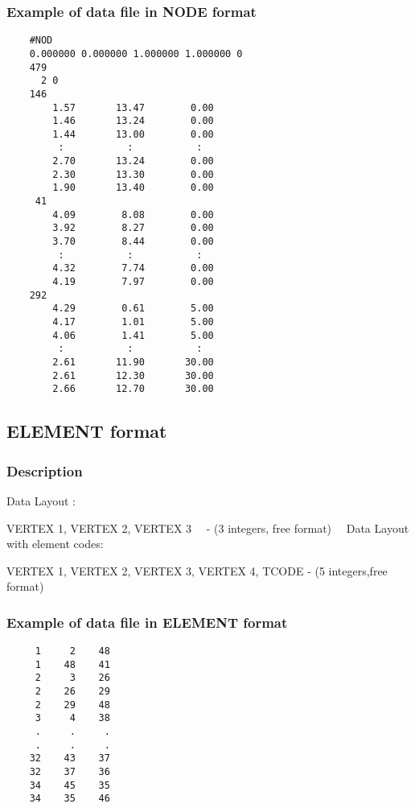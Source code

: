 \documentclass{article}
\begin{document}
\subsubsection{Example of data file in NODE format}

\begin{small}
\begin{lstlisting}
    #NOD 
    0.000000 0.000000 1.000000 1.000000 0 
    479
      2 0
    146
        1.57       13.47        0.00
        1.46       13.24        0.00
        1.44       13.00        0.00
         :           :           :
        2.70       13.24        0.00
        2.30       13.30        0.00
        1.90       13.40        0.00
     41
        4.09        8.08        0.00
        3.92        8.27        0.00
        3.70        8.44        0.00
         :           :           :
        4.32        7.74        0.00
        4.19        7.97        0.00
    292
        4.29        0.61        5.00
        4.17        1.01        5.00
        4.06        1.41        5.00
         :           :           :
        2.61       11.90       30.00
        2.61       12.30       30.00
        2.66       12.70       30.00
\end{lstlisting}
\end{small}

\subsection{ELEMENT format}
\subsubsection[Description]{Description}

\bigskip

Data Layout :

VERTEX 1, VERTEX 2, VERTEX 3 \ \ {}- (3 integers, free format)\newline
\ \ Data Layout with element codes:

VERTEX 1, VERTEX 2, VERTEX 3, VERTEX 4, TCODE - (5 integers,free format)

\subsubsection{Example of data file in ELEMENT format}
\begin{small}
\begin{lstlisting}
     1     2    48
     1    48    41
     2     3    26
     2    26    29
     2    29    48
     3     4    38
     .     .     .
     .     .     .
    32    43    37
    32    37    36
    34    45    35
    34    35    46
\end{lstlisting}
\end{small}
\end{document}
